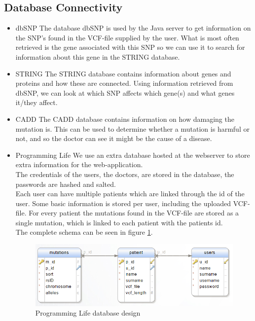 	\subsection{Database Connectivity}
		\begin{itemize}
			\item dbSNP
				\subitem The database dbSNP is used by the Java server to get information on the SNP's found in the VCF-file supplied by the user. What is most often retrieved is the gene associated with this SNP so we can use it to search for information about this gene in the STRING database.
			\item STRING
				\subitem The STRING database contains information about genes and proteins and how these are connected. Using information retrieved from dbSNP, we can look at which SNP affects which gene(s) and what genes it/they affect.
			\item CADD
				\subitem The CADD database contains information on how damaging the mutation is. This can be used to determine whether a mutation is harmful or not, and so the doctor can see it might be the cause of a disease.
			\item Programming Life
				\subitem We use an extra database hosted at the webserver to store extra information for the web-application. \\
				The credentials of the users, the doctors, are stored in the database, the passwords are hashed and salted.\\
				Each user can have multiple patients which are linked through the id of the user.
				Some basic information is stored per user, including the uploaded VCF-file.
				For every patient the mutations found in the VCF-file are stored as a single mutation, which is linked to each patient with the patients id.\\
				The complete schema can be seen in figure \ref{fig:dbdesign}.
				\begin{figure}
					\centering
					\includegraphics[scale=0.55]{erd.png}
					\caption{Programming Life database design}
					\label{fig:dbdesign}
				\end{figure}
		\end{itemize}
		
